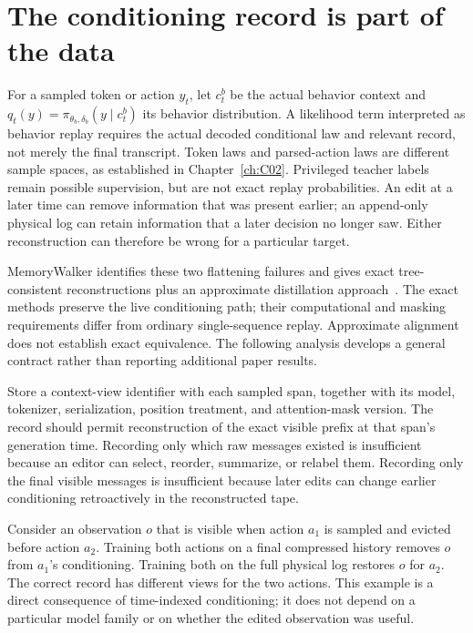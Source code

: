 \section{The conditioning record is part of the data}\label{sec:C17:conditioning}
For a sampled token or action $y_t$, let $c_t^{b}$ be the actual behavior context and $q_t(y)=\pi_{\theta_b,\delta_b}(y\mid c_t^{b})$ its behavior distribution. A likelihood term interpreted as behavior replay requires the actual decoded conditional law and relevant record, not merely the final transcript. Token laws and parsed-action laws are different sample spaces, as established in Chapter~\ref{ch:C02}. Privileged teacher labels remain possible supervision, but are not exact replay probabilities. An edit at a later time can remove information that was present earlier; an append-only physical log can retain information that a later decision no longer saw. Either reconstruction can therefore be wrong for a particular target.

MemoryWalker identifies these two flattening failures and gives exact tree-consistent reconstructions plus an approximate distillation approach~\cite{j2026memorywalker}. The exact methods preserve the live conditioning path; their computational and masking requirements differ from ordinary single-sequence replay. Approximate alignment does not establish exact equivalence. The following analysis develops a general contract rather than reporting additional paper results.

Store a context-view identifier with each sampled span, together with its model, tokenizer, serialization, position treatment, and attention-mask version. The record should permit reconstruction of the exact visible prefix at that span's generation time. Recording only which raw messages existed is insufficient because an editor can select, reorder, summarize, or relabel them. Recording only the final visible messages is insufficient because later edits can change earlier conditioning retroactively in the reconstructed tape.

Consider an observation $o$ that is visible when action $a_1$ is sampled and evicted before action $a_2$. Training both actions on a final compressed history removes $o$ from $a_1$'s conditioning. Training both on the full physical log restores $o$ for $a_2$. The correct record has different views for the two actions. This example is a direct consequence of time-indexed conditioning; it does not depend on a particular model family or on whether the edited observation was useful.

